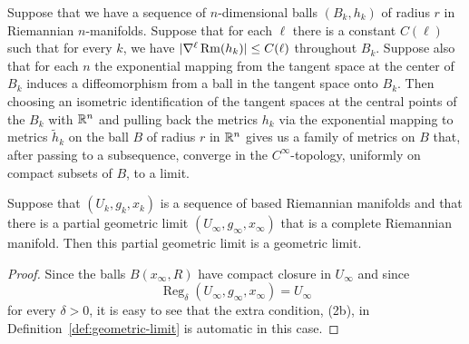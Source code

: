 \begin{lemma}\label{lem:gaussian-coordinates-convergence}

Suppose that we have a sequence of $n$-dimensional balls $(B_k,h_k)$
of radius $r$ in Riemannian $n$-manifolds. Suppose that for each
$\ell$ there is a constant $C(\ell)$ such that for every $k$, we
have $|\nabla ^\ell \operatorname{Rm}(h_k)|\le C(\ell)$ throughout $B_k$.
Suppose also that for each $n$ the exponential mapping from the
tangent space at the center of $B_k$ induces a diffeomorphism from a
ball in the tangent space onto $B_k$. Then choosing an isometric
identification of the tangent spaces at the central points of the
$B_k$ with $\mathbb{R}^n$ and pulling back the metrics $h_k$ via the
exponential mapping to metrics $\tilde h_k$ on the ball $B$ of
radius $r$ in $\mathbb{R}^n$ gives us a family of metrics on $B$ that,
after passing to a subsequence, converge in the $C^\infty$-topology,
uniformly on compact subsets of $B$, to a limit.
\end{lemma}

\begin{lemma}\label{lem:partial-limit-complete-is-limit}


Suppose that $(U_k,g_k,x_k)$ is a sequence of based Riemannian
manifolds and that there is a partial geometric limit
$(U_\infty,g_\infty,x_\infty)$ that is a complete Riemannian
manifold. Then this partial geometric limit is a geometric limit.
\end{lemma}




\begin{proof}
\sketch
{}
Since the balls $B(x_\infty,R)$ have compact closure in $U_\infty$
and since
$$\operatorname{Reg}_\delta(U_\infty,g_\infty,x_\infty)=U_\infty$$ for
every $\delta>0$, it is easy to see that the extra condition, (2b), in
Definition~\ref{def:geometric-limit} is automatic in this case.
\end{proof}

